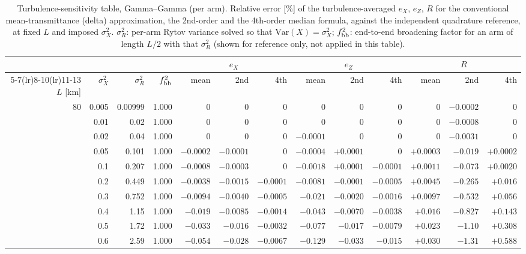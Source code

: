 \documentclass[11pt,a4paper]{article}
\begin{document}
\begin{table}[htbp]
\centering\scriptsize
\caption{Turbulence-sensitivity table, Gamma--Gamma (per arm). Relative error [\%] of the turbulence-averaged $e_X$, $e_Z$, $R$ for the conventional mean-transmittance (delta) approximation, the 2nd-order and the 4th-order median formula, against the independent quadrature reference, at fixed $L$ and imposed $\sigma_X^2$. $\sigma_R^2$: per-arm Rytov variance solved so that $\mathrm{Var}(X)=\sigma_X^2$; $f_{\rm bb}^2$: end-to-end broadening factor for an arm of length $L/2$ with that $\sigma_R^2$ (shown for reference only, not applied in this table).}
\label{tab:sens-GG}
\begin{tabular}{rrrrrrrrrrrrr}
\toprule
 & & & & \multicolumn{3}{c}{$e_X$} & \multicolumn{3}{c}{$e_Z$} & \multicolumn{3}{c}{$R$}\\
\cmidrule(lr){5-7}\cmidrule(lr){8-10}\cmidrule(lr){11-13}
$L$ [km] & $\sigma_X^2$ & $\sigma_R^2$ & $f_{\rm bb}^2$ & mean & 2nd & 4th & mean & 2nd & 4th & mean & 2nd & 4th\\
\midrule
80 & 0.005 & 0.00999 & 1.000 & $0$ & $0$ & $0$ & $0$ & $0$ & $0$ & $0$ & $-0.0002$ & $0$ \\
 & 0.01 & 0.02 & 1.000 & $0$ & $0$ & $0$ & $0$ & $0$ & $0$ & $0$ & $-0.0008$ & $0$ \\
 & 0.02 & 0.04 & 1.000 & $0$ & $0$ & $0$ & $-0.0001$ & $0$ & $0$ & $0$ & $-0.0031$ & $0$ \\
 & 0.05 & 0.101 & 1.000 & $-0.0002$ & $-0.0001$ & $0$ & $-0.0004$ & $+0.0001$ & $0$ & $+0.0003$ & $-0.019$ & $+0.0002$ \\
 & 0.1 & 0.207 & 1.000 & $-0.0008$ & $-0.0003$ & $0$ & $-0.0018$ & $+0.0001$ & $-0.0001$ & $+0.0011$ & $-0.073$ & $+0.0020$ \\
 & 0.2 & 0.449 & 1.000 & $-0.0038$ & $-0.0015$ & $-0.0001$ & $-0.0081$ & $-0.0001$ & $-0.0005$ & $+0.0045$ & $-0.265$ & $+0.016$ \\
 & 0.3 & 0.752 & 1.000 & $-0.0094$ & $-0.0040$ & $-0.0005$ & $-0.021$ & $-0.0020$ & $-0.0016$ & $+0.0097$ & $-0.532$ & $+0.056$ \\
 & 0.4 & 1.15 & 1.000 & $-0.019$ & $-0.0085$ & $-0.0014$ & $-0.043$ & $-0.0070$ & $-0.0038$ & $+0.016$ & $-0.827$ & $+0.143$ \\
 & 0.5 & 1.72 & 1.000 & $-0.033$ & $-0.016$ & $-0.0032$ & $-0.077$ & $-0.017$ & $-0.0079$ & $+0.023$ & $-1.10$ & $+0.308$ \\
 & 0.6 & 2.59 & 1.000 & $-0.054$ & $-0.028$ & $-0.0067$ & $-0.129$ & $-0.033$ & $-0.015$ & $+0.030$ & $-1.31$ & $+0.588$ \\

\end{tabular}
\end{table}
\end{document}
